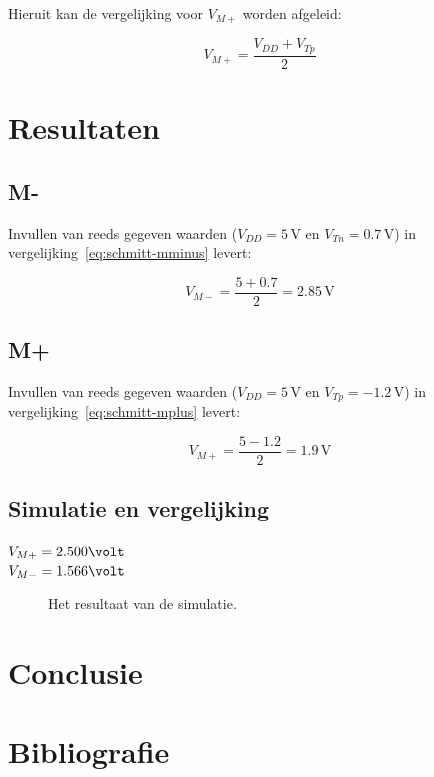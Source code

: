 \documentclass{scrartcl}  %
\begin{document}
Hieruit kan de vergelijking voor $V_{M+}$ worden afgeleid:

\begin{equation} \label{eq:schmitt-mplus}
V_{M+} = \frac{V_{DD}+V_{Tp}}{2}
\end{equation}

\section{Resultaten}
\label{sec:trig-res}
\subsection{M-}
\label{subsec:trig-res-mminus}
Invullen van reeds gegeven waarden ($V_{DD} = 5 \,\textrm{V}$ en $V_{Tn} = 0.7 \,\textrm{V}$) in vergelijking~\ref{eq:schmitt-mminus} levert:

\begin{equation} \label{eq:schmitt-mminus-val}
V_{M-} = \frac{5+0.7}{2} = 2.85 \,\textrm{V}
\end{equation}

\subsection{M+}
\label{subsec:trig-res-mplus}
Invullen van reeds gegeven waarden ($V_{DD} = 5 \,\textrm{V}$ en $V_{Tp} = -1.2 \,\textrm{V}$) in vergelijking~\ref{eq:schmitt-mplus} levert:

\begin{equation} \label{eq:schmitt-mplus-val}
V_{M+} = \frac{5-1.2}{2} = 1.9 \,\textrm{V}
\end{equation}

\subsection{Simulatie en vergelijking}
\label{subsec:trig-res-verg}


$V_{M+} = 2.500 \volt$\\
$V_{M-} = 1.566 \volt$
\begin{figure}[H]
\centering
	\setlength{} 
	\setlength{}
	
	\caption{Het resultaat van de simulatie.}
	\label{fig:st}
\end{figure}

\section{Conclusie}
\label{sec:trig-conclusie}


\newpage
{}
\section{Bibliografie}
\printbibliography
\end{document}
